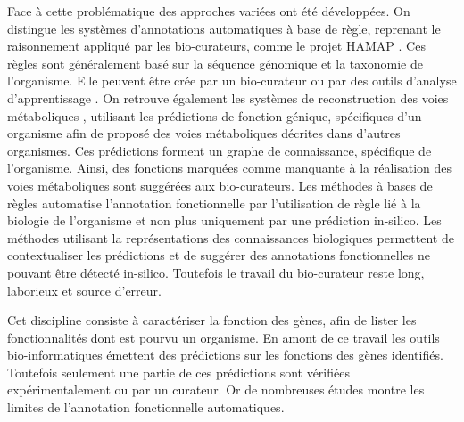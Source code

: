 Face à cette problématique des approches variées ont été développées. On distingue les systèmes d'annotations automatiques à base de règle, reprenant le raisonnement appliqué par les bio-curateurs, comme le projet HAMAP \cite{lima2009hamap}. Ces règles sont généralement basé sur la séquence génomique et la taxonomie de l'organisme. Elle peuvent être crée par un bio-curateur ou par des outils d'analyse d'apprentissage \cite{uniprot2011ongoing}. On retrouve également les systèmes de reconstruction des voies métaboliques \cite{karpe2011pathway}, utilisant les prédictions de fonction génique, spécifiques d'un organisme afin de proposé des voies métaboliques décrites dans d'autres organismes. Ces prédictions forment un graphe de connaissance, spécifique de l'organisme. Ainsi, des fonctions marquées comme manquante à la réalisation des voies métaboliques sont suggérées aux bio-curateurs. Les méthodes à bases de règles automatise l'annotation fonctionnelle par l'utilisation de règle lié à la biologie de l'organisme et non plus uniquement par une prédiction in-silico.  Les méthodes utilisant la représentations des connaissances biologiques permettent de contextualiser les prédictions et de suggérer des annotations fonctionnelles ne pouvant être détecté in-silico. Toutefois le travail du bio-curateur reste long, laborieux et source d'erreur.



Cet discipline consiste à caractériser la fonction des gènes, afin de lister les fonctionnalités dont est pourvu un organisme. En amont de ce travail les outils bio-informatiques émettent des prédictions sur les fonctions des gènes identifiés. Toutefois seulement une partie de ces prédictions sont vérifiées expérimentalement ou par un curateur. Or de nombreuses études montre les limites de l'annotation fonctionnelle automatiques. 




